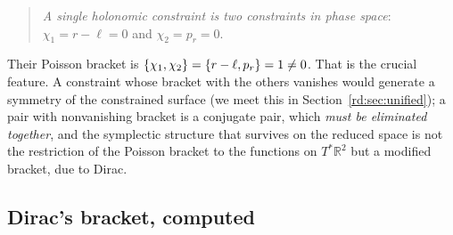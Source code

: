 \begin{quote}
\emph{A single holonomic constraint is two constraints in phase space}: $\chi_1=r-\ell=0$ and $\chi_2=p_r=0$.
\end{quote}

Their Poisson bracket is $\{\chi_1,\chi_2\}=\{r-\ell,p_r\}=1\neq0$. That is the crucial feature. A constraint whose bracket with the others vanishes would generate a symmetry of the constrained surface (we meet this in Section~\ref{rd:sec:unified}); a pair with nonvanishing bracket is a conjugate pair, which \emph{must be eliminated together}, and the symplectic structure that survives on the reduced space is not the restriction of the Poisson bracket to the functions on $T^*\mathbb R^2$ but a modified bracket, due to Dirac.

\subsection{Dirac's bracket, computed}\label{rd:sec:dirac}


